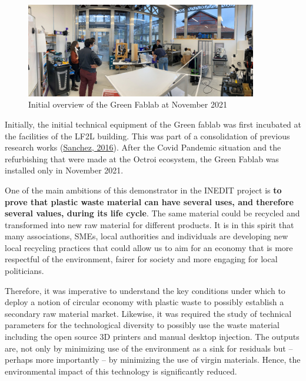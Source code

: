 \documentclass[
  11pt,
]{article}
\begin{document}
\begin{figure}[H]

{\centering \includegraphics[width=0.9\textwidth,height=\textheight]{figures/2021-11-17-octroi.jpeg}

}

\caption{\label{fig-gf-2021}Initial overview of the Green Fablab at
November 2021}

\end{figure}

Initially, the initial technical equipment of the Green fablab was first
incubated at the facilities of the LF2L building. This was part of a
consolidation of previous research works
(\protect\hyperlink{ref-sanchez2016}{Sanchez, 2016}). After the Covid
Pandemic situation and the refurbishing that were made at the Octroi
ecosystem, the Green Fablab was installed only in November 2021.

One of the main ambitions of this demonstrator in the INEDIT project is
\textbf{to prove that plastic waste material can have several uses, and
therefore several values, during its life cycle}. The same material
could be recycled and transformed into new raw material for different
products. It is in this spirit that many associations, SMEs, local
authorities and individuals are developing new local recycling practices
that could allow us to aim for an economy that is more respectful of the
environment, fairer for society and more engaging for local politicians.

Therefore, it was imperative to understand the key conditions under
which to deploy a notion of circular economy with plastic waste to
possibly establish a secondary raw material market. Likewise, it was
required the study of technical parameters for the technological
diversity to possibly use the waste material including the open source
3D printers and manual desktop injection. The outputs are, not only by
minimizing use of the environment as a sink for residuals but -- perhaps
more importantly -- by minimizing the use of virgin materials. Hence,
the environmental impact of this technology is significantly reduced.
\end{document}
